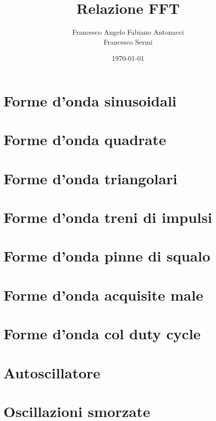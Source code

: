 \documentclass{article}
\author{Francesco Angelo Fabiano Antonacci\\Francesco Sermi}
\date{\today}
\title{Relazione FFT}
\begin{document}
\maketitle
\section{Forme d'onda sinusoidali}

\section{Forme d'onda quadrate}

\section{Forme d'onda triangolari}

\section{Forme d'onda treni di impulsi}

\section{Forme d'onda pinne di squalo}

\section{Forme d'onda acquisite male}

\section{Forme d'onda col duty cycle}

\section{Autoscillatore}

\section{Oscillazioni smorzate}
\end{document}
